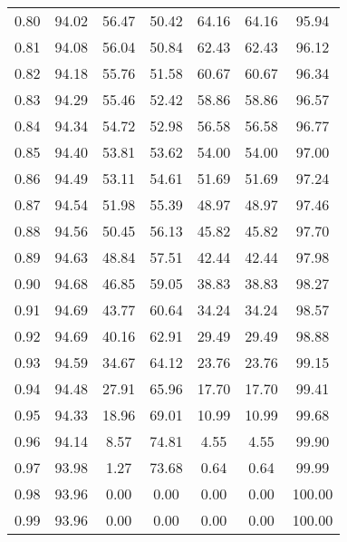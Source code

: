 \begin{tabular}{|c|c|c|c|c|c|c|}
      0.80 &     94.02 &     56.47 &      50.42 &   64.16 &      64.16 &         95.94 \\
      0.81 &     94.08 &     56.04 &      50.84 &   62.43 &      62.43 &         96.12 \\
      0.82 &     94.18 &     55.76 &      51.58 &   60.67 &      60.67 &         96.34 \\
      0.83 &     94.29 &     55.46 &      52.42 &   58.86 &      58.86 &         96.57 \\
      0.84 &     94.34 &     54.72 &      52.98 &   56.58 &      56.58 &         96.77 \\
      0.85 &     94.40 &     53.81 &      53.62 &   54.00 &      54.00 &         97.00 \\
      0.86 &     94.49 &     53.11 &      54.61 &   51.69 &      51.69 &         97.24 \\
      0.87 &     94.54 &     51.98 &      55.39 &   48.97 &      48.97 &         97.46 \\
      0.88 &     94.56 &     50.45 &      56.13 &   45.82 &      45.82 &         97.70 \\
      0.89 &     94.63 &     48.84 &      57.51 &   42.44 &      42.44 &         97.98 \\
      0.90 &     94.68 &     46.85 &      59.05 &   38.83 &      38.83 &         98.27 \\
      0.91 &     94.69 &     43.77 &      60.64 &   34.24 &      34.24 &         98.57 \\
      0.92 &     94.69 &     40.16 &      62.91 &   29.49 &      29.49 &         98.88 \\
      0.93 &     94.59 &     34.67 &      64.12 &   23.76 &      23.76 &         99.15 \\
      0.94 &     94.48 &     27.91 &      65.96 &   17.70 &      17.70 &         99.41 \\
      0.95 &     94.33 &     18.96 &      69.01 &   10.99 &      10.99 &         99.68 \\
      0.96 &     94.14 &      8.57 &      74.81 &    4.55 &       4.55 &         99.90 \\
      0.97 &     93.98 &      1.27 &      73.68 &    0.64 &       0.64 &         99.99 \\
      0.98 &     93.96 &      0.00 &       0.00 &    0.00 &       0.00 &        100.00 \\
      0.99 &     93.96 &      0.00 &       0.00 &    0.00 &       0.00 &        100.00 \\
\bottomrule
\end{tabular}
